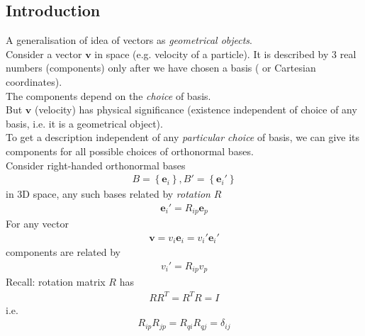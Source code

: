\documentclass[a4paper]{article}
\begin{document}
\subsection{Introduction}
A generalisation of idea of vectors as \emph{geometrical objects}.\\
Consider a vector $\mathbf{v}$ in space (e.g. velocity of a particle).
It is described by 3 real numbers (components) only after we have chosen a basis ( or Cartesian coordinates).\\
The components depend on the \emph{choice} of basis.\\
But $\mathbf{v}$ (velocity) has physical significance (existence independent of choice of any basis, i.e. it is a geometrical object).\\
To get a description independent of any \emph{particular choice} of basis, we can give its components for all possible choices of orthonormal bases.\\
Consider right-handed orthonormal bases
\begin{equation*}
\begin{aligned}
B=\left\{\mathbf{e}_i\right\},B' = \left\{\mathbf{e}_i'\right\}
\end{aligned}
\end{equation*}
in 3D space, any such bases related by \emph{rotation} $R$
\begin{equation*}
\begin{aligned}
\mathbf{e}_i' = R_{ip} \mathbf{e}_p
\end{aligned}
\end{equation*}
For any vector
\begin{equation*}
\begin{aligned}
\mathbf{v}=v_i \mathbf{e}_i = v_i' \mathbf{e}_i'
\end{aligned}
\end{equation*}
components are related by
\begin{equation*}
\begin{aligned}
v_i' = R_{ip}v_p
\end{aligned}
\end{equation*}
Recall: rotation matrix $R$ has
\begin{equation*}
\begin{aligned}
RR^T = R^TR = I
\end{aligned}
\end{equation*}
i.e.
\begin{equation*}
\begin{aligned}
R_{ip}R_{jp} = R_{qi} R_{qj} = \delta_{ij}
\end{aligned}
\end{equation*}
\end{document}

